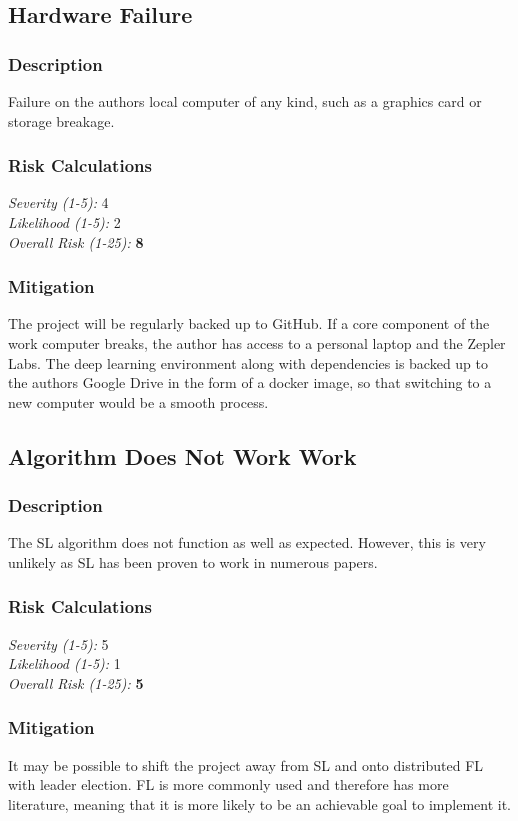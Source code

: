 \subsection{Hardware Failure}
\subsubsection{Description}
Failure on the authors local computer of any kind, such as a graphics card or storage breakage.

\subsubsection{Risk Calculations}
\emph{Severity (1-5):} 4 \\
\emph{Likelihood (1-5):} 2 \\
\emph{Overall Risk (1-25):} \textbf{8}

\subsubsection{Mitigation}
The project will be regularly backed up to GitHub. If a core component of the work computer breaks, the author has access to a personal laptop and the Zepler Labs. The deep learning environment along with dependencies is backed up to the authors Google Drive in the form of a docker image, so that switching to a new computer would be a smooth process.

\subsection{Algorithm Does Not Work Work}
\subsubsection{Description}
The SL algorithm does not function as well as expected. However, this is very unlikely as SL has been proven to work in numerous papers.

\subsubsection{Risk Calculations}
\emph{Severity (1-5):} 5 \\
\emph{Likelihood (1-5):} 1 \\
\emph{Overall Risk (1-25):} \textbf{5}

\subsubsection{Mitigation}
It may be possible to shift the project away from SL and onto distributed FL with leader election. FL is more commonly used and therefore has more literature, meaning that it is more likely to be an achievable goal to implement it.